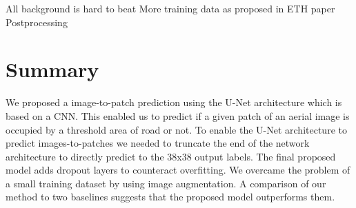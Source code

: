 \documentclass[10pt,conference,compsocconf]{IEEEtran}
\begin{document}
All background is hard to beat
More training data as proposed in ETH paper
Postprocessing

\section{Summary}

We proposed a image-to-patch prediction using the U-Net architecture which is based on a CNN. This enabled us to predict if a given patch of an aerial image is occupied by a threshold area of road or not. To enable the U-Net architecture to predict images-to-patches we needed to truncate the end of the network architecture to directly predict to the 38x38 output labels. The final proposed model adds dropout layers to counteract overfitting. We overcame the problem of a small training dataset by using image augmentation. A comparison of our method to two baselines suggests that the proposed model outperforms them.






\end{document}
